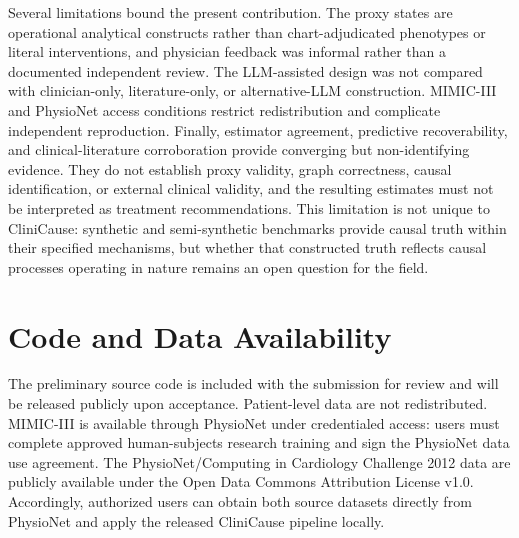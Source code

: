 \documentclass[letterpaper]{article}
\begin{document}
Several limitations bound the present contribution. The proxy states are
operational analytical constructs rather than chart-adjudicated phenotypes or
literal interventions, and physician feedback was informal rather than a
documented independent review. The LLM-assisted design was not compared with
clinician-only, literature-only, or alternative-LLM construction. MIMIC-III and
PhysioNet access conditions restrict redistribution and complicate independent
reproduction. Finally, estimator agreement, predictive recoverability, and
clinical-literature corroboration provide converging but non-identifying
evidence. They do not establish proxy validity, graph correctness, causal
identification, or external clinical validity, and the resulting estimates
must not be interpreted as treatment recommendations. This limitation is not
unique to CliniCause: synthetic and semi-synthetic benchmarks provide causal
truth within their specified mechanisms, but whether that constructed truth
reflects causal processes operating in nature remains an open question for the
field.

\section*{Code and Data Availability}

The preliminary source code is included with the submission for review and will
be released publicly upon acceptance. Patient-level data are not redistributed.
MIMIC-III is available through PhysioNet under credentialed access: users must
complete approved human-subjects research training and sign the PhysioNet data
use agreement. The PhysioNet/Computing in Cardiology Challenge 2012 data are
publicly available under the Open Data Commons Attribution License v1.0.
Accordingly, authorized users can obtain both source datasets directly from
PhysioNet and apply the released CliniCause pipeline locally.


   
\end{document}
